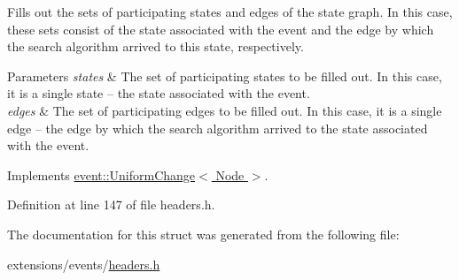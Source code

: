 Fills out the sets of participating states and edges of the state graph. In this case, these sets consist of the state associated with the event and the edge by which the search algorithm arrived to this state, respectively. 


\begin{DoxyParams}{Parameters}
{\em states} & The set of participating states to be filled out. In this case, it is a single state -- the state associated with the event. \\
\hline
{\em edges} & The set of participating edges to be filled out. In this case, it is a single edge -- the edge by which the search algorithm arrived to the state associated with the event. \\
\hline
\end{DoxyParams}


Implements \hyperlink{structevent_1_1UniformChange_a582bd18d2ec423a5baf7e6b9263ae762}{event\+::\+Uniform\+Change$<$ Node $>$}.



Definition at line 147 of file headers.\+h.



The documentation for this struct was generated from the following file\+:\begin{DoxyCompactItemize}
\item 
extensions/events/\hyperlink{extensions_2events_2headers_8h}{headers.\+h}\end{DoxyCompactItemize}
